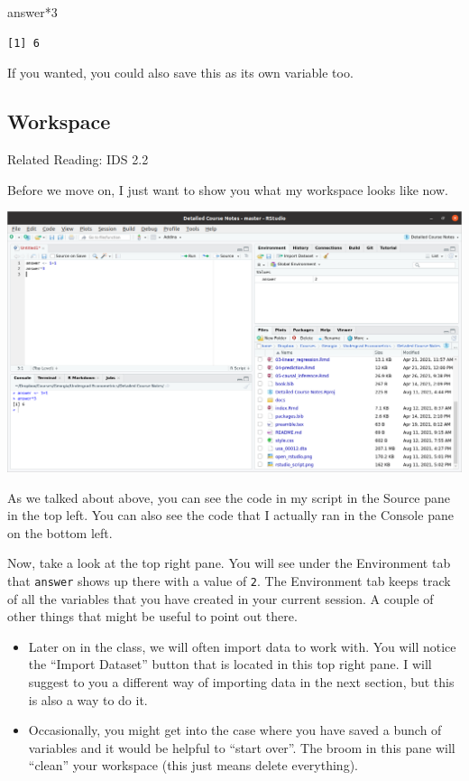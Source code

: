 \documentclass[
  letterpaper,
  DIV=11,
  numbers=noendperiod]{scrreprt}
\newenvironment{Shaded}{\begin{snugshade}}{\end{snugshade}}
\newcommand{\DecValTok}[1]{\textcolor[rgb]{0.68,0.00,0.00}{#1}}
\newcommand{\NormalTok}[1]{\textcolor[rgb]{0.00,0.23,0.31}{#1}}
\newcommand{\SpecialCharTok}[1]{\textcolor[rgb]{0.37,0.37,0.37}{#1}}
\begin{document}
\begin{Shaded}
\begin{Highlighting}[]
\NormalTok{answer}\SpecialCharTok{*}\DecValTok{3}
\end{Highlighting}
\end{Shaded}

\begin{verbatim}
[1] 6
\end{verbatim}

If you wanted, you could also save this as its own variable too.

\subsection{Workspace}\label{workspace}

Related Reading: IDS 2.2

Before we move on, I just want to show you what my workspace looks like
now.

\includegraphics{rstudio_environment.png}

As we talked about above, you can see the code in my script in the
Source pane in the top left. You can also see the code that I actually
ran in the Console pane on the bottom left.

Now, take a look at the top right pane. You will see under the
Environment tab that \texttt{answer} shows up there with a value of
\texttt{2}. The Environment tab keeps track of all the variables that
you have created in your current session. A couple of other things that
might be useful to point out there.

\begin{itemize}
\item
  Later on in the class, we will often import data to work with. You
  will notice the ``Import Dataset'' button that is located in this top
  right pane. I will suggest to you a different way of importing data in
  the next section, but this is also a way to do it.
\item
  Occasionally, you might get into the case where you have saved a bunch
  of variables and it would be helpful to ``start over''. The broom in
  this pane will ``clean'' your workspace (this just means delete
  everything).
\end{itemize}
\end{document}
